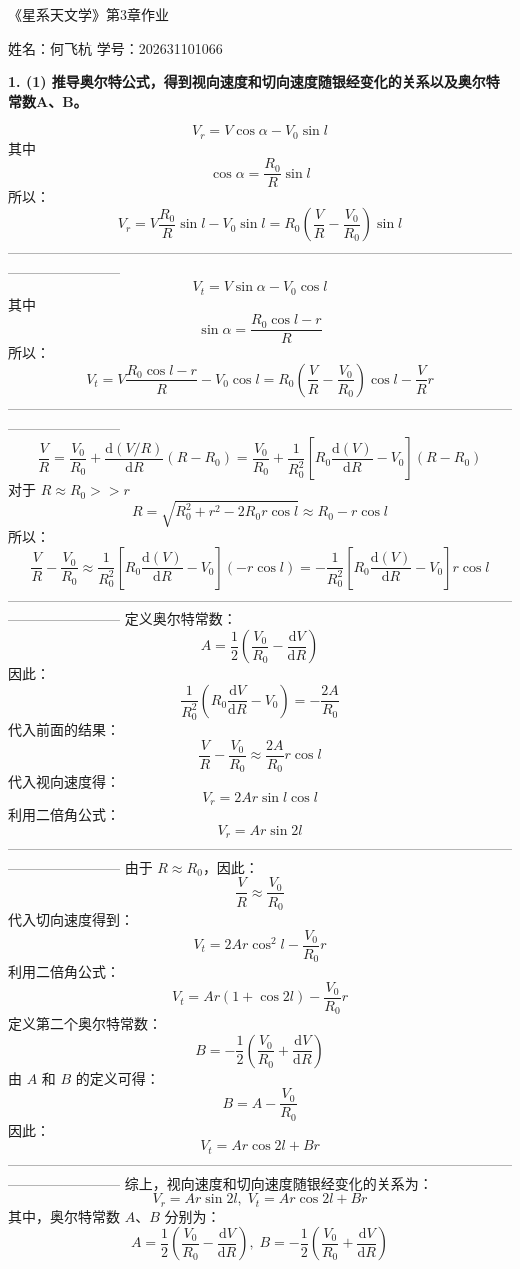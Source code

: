 \documentclass{ctexart}
\begin{document}
\begin{center}
    {\LARGE 《星系天文学》第3章作业}

    \vspace{1em}

    姓名：何飞杭 \qquad 学号：202631101066
\end{center}

\noindent\textbf{1. (1) 推导奥尔特公式，得到视向速度和切向速度随银经变化的关系以及奥尔特常数A、B。}

\vspace{15em}

\[V_r = V \cos \alpha - V_0 \sin l\]
其中
\[\cos \alpha = \frac{R_0}{R} \sin l\]
所以：
\[V_r = V \frac{R_0}{R} \sin l - V_0 \sin l = R_0(\frac{V}{R} - \frac{V_0}{R_0}) \sin l\]
------------------------------------------------------------------------------------------------------------------------------------
\[V_t = V \sin \alpha - V_0 \cos l\]
其中
\[\sin \alpha = \frac{R_0 \cos l-r}{R}\]
所以：
\[V_t = V \frac{R_0 \cos l - r}{R} - V_0 \cos l = R_0(\frac{V}{R} - \frac{V_0}{R_0}) \cos l - \frac{V}{R} r\]
------------------------------------------------------------------------------------------------------------------------------------
\[\frac{V}{R} = \frac{V_0}{R_0} + \frac{\mathrm{d}(V/R)}{\mathrm{d}R}(R-R_0) = \frac{V_0}{R_0} + \frac{1}{R_0^2}[R_0\frac{\mathrm{d}(V)}{\mathrm{d}R} - V_0](R-R_0)\]
对于 \(R \approx R_0 >> r\)
\[R = \sqrt{R_0^2 + r^2 - 2 R_0 r \cos l} \approx R_0 - r \cos l\]
所以：
\[\frac{V}{R} - \frac{V_0}{R_0} \approx \frac{1}{R_0^2}[R_0\frac{\mathrm{d}(V)}{\mathrm{d}R} - V_0](-r  \cos l) = -\frac{1}{R_0^2}[R_0\frac{\mathrm{d}(V)}{\mathrm{d}R} - V_0]r \cos l\]
------------------------------------------------------------------------------------------------------------------------------------
定义奥尔特常数：
\[
A=\frac{1}{2}\left(\frac{V_0}{R_0}-\frac{\mathrm{d}V}{\mathrm{d}R}\right)
\]
因此：
\[
\frac{1}{R_0^2}\left(R_0\frac{\mathrm{d}V}{\mathrm{d}R}-V_0\right)
=-\frac{2A}{R_0}
\]
代入前面的结果：
\[
\frac{V}{R}-\frac{V_0}{R_0}
\approx \frac{2A}{R_0}r\cos l
\]
代入视向速度得：
\[
V_r=2Ar\sin l\cos l
\]
利用二倍角公式：
\[
V_r=Ar\sin 2l
\]
------------------------------------------------------------------------------------------------------------------------------------
由于 \(R\approx R_0\)，因此：
\[
\frac{V}{R}\approx\frac{V_0}{R_0}
\]
代入切向速度得到：
\[
V_t=2Ar\cos^2 l-\frac{V_0}{R_0}r
\]
利用二倍角公式：
\[
V_t=Ar(1+\cos 2l)-\frac{V_0}{R_0}r
\]
定义第二个奥尔特常数：
\[
B=-\frac{1}{2}\left(\frac{V_0}{R_0}
+\frac{\mathrm{d}V}{\mathrm{d}R}\right)
\]
由 \(A\) 和 \(B\) 的定义可得：
\[
B=A-\frac{V_0}{R_0}
\]
因此：
\[
V_t=Ar\cos 2l+Br
\]
------------------------------------------------------------------------------------------------------------------------------------
综上，视向速度和切向速度随银经变化的关系为：
\[
V_r = Ar\sin 2l,\; V_t = Ar\cos 2l+Br
\]
其中，奥尔特常数 \(A\)、\(B\) 分别为：
\[
A=\frac{1}{2}\left(\frac{V_0}{R_0} -\frac{\mathrm{d}V}{\mathrm{d}R}\right),\; B=-\frac{1}{2}\left(\frac{V_0}{R_0} +\frac{\mathrm{d}V}{\mathrm{d}R}\right)
\]
\end{document}
